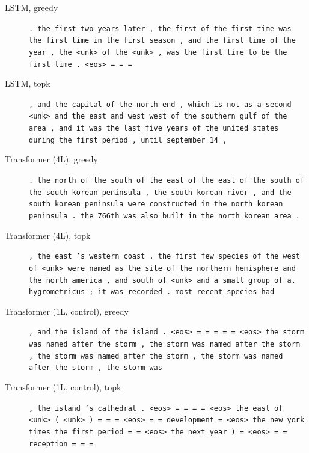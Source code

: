 \begin{description}
\item[LSTM, greedy] \texttt{\small . the first two years later , the first of the first time was the first time in the first season , and the first time of the year , the \textless{}unk\textgreater{} of the \textless{}unk\textgreater{} , was the first time to be the first time . \textless{}eos\textgreater{} = = =}
\item[LSTM, topk] \texttt{\small , and the capital of the north end , which is not as a second \textless{}unk\textgreater{} and the east and west west of the southern gulf of the area , and it was the last five years of the united states during the first period , until september 14 ,}
\item[Transformer (4L), greedy] \texttt{\small . the north of the south of the east of the east of the south of the south korean peninsula , the south korean river , and the south korean peninsula were constructed in the north korean peninsula . the 766th was also built in the north korean area .}
\item[Transformer (4L), topk] \texttt{\small , the east 's western coast . the first few species of the west of \textless{}unk\textgreater{} were named as the site of the northern hemisphere and the north america , and south of \textless{}unk\textgreater{} and a small group of a. hygrometricus ; it was recorded . most recent species had}
\item[Transformer (1L, control), greedy] \texttt{\small , and the island of the island . \textless{}eos\textgreater{} = = = = = \textless{}eos\textgreater{} the storm was named after the storm , the storm was named after the storm , the storm was named after the storm , the storm was named after the storm , the storm was}
\item[Transformer (1L, control), topk] \texttt{\small , the island 's cathedral . \textless{}eos\textgreater{} = = = = \textless{}eos\textgreater{} the east of \textless{}unk\textgreater{} ( \textless{}unk\textgreater{} ) = = = \textless{}eos\textgreater{} = = development = \textless{}eos\textgreater{} the new york times the first period = = \textless{}eos\textgreater{} the next year ) = \textless{}eos\textgreater{} = = reception = = =}
\end{description}
